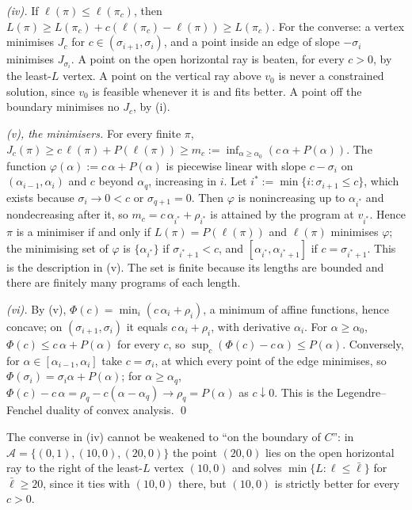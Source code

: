 \emph{(iv).} If $\ell(\pi)\le\ell(\pi_c)$, then $L(\pi)\ge L(\pi_c)+c(\ell(\pi_c)-\ell(\pi))\ge L(\pi_c)$. For the converse: a vertex minimises $J_c$ for $c\in(\sigma_{i+1},\sigma_i)$, and a point inside an edge of slope $-\sigma_i$ minimises $J_{\sigma_i}$. A point on the open horizontal ray is beaten, for every $c>0$, by the least-$L$ vertex. A point on the vertical ray above $v_0$ is never a constrained solution, since $v_0$ is feasible whenever it is and fits better. A point off the boundary minimises no $J_c$, by (i).

\emph{(v), the minimisers.} For every finite $\pi$, $J_c(\pi)\ge c\,\ell(\pi)+P(\ell(\pi))\ge m_c:=\inf_{\alpha\ge\alpha_0}(c\,\alpha+P(\alpha))$. The function $\varphi(\alpha):=c\,\alpha+P(\alpha)$ is piecewise linear with slope $c-\sigma_i$ on $(\alpha_{i-1},\alpha_i)$ and $c$ beyond $\alpha_q$, increasing in $i$. Let $i^*:=\min\{i:\sigma_{i+1}\le c\}$, which exists because $\sigma_i\to0<c$ or $\sigma_{q+1}=0$. Then $\varphi$ is nonincreasing up to $\alpha_{i^*}$ and nondecreasing after it, so $m_c=c\,\alpha_{i^*}+\rho_{i^*}$ is attained by the program at $v_{i^*}$. Hence $\pi$ is a minimiser if and only if $L(\pi)=P(\ell(\pi))$ and $\ell(\pi)$ minimises $\varphi$; the minimising set of $\varphi$ is $\{\alpha_{i^*}\}$ if $\sigma_{i^*+1}<c$, and $[\alpha_{i^*},\alpha_{i^*+1}]$ if $c=\sigma_{i^*+1}$. This is the description in (v). The set is finite because its lengths are bounded and there are finitely many programs of each length.

\emph{(vi).} By (v), $\Phi(c)=\min_i(c\,\alpha_i+\rho_i)$, a minimum of affine functions, hence concave; on $(\sigma_{i+1},\sigma_i)$ it equals $c\,\alpha_i+\rho_i$, with derivative $\alpha_i$. For $\alpha\ge\alpha_0$, $\Phi(c)\le c\,\alpha+P(\alpha)$ for every $c$, so $\sup_c(\Phi(c)-c\,\alpha)\le P(\alpha)$. Conversely, for $\alpha\in[\alpha_{i-1},\alpha_i]$ take $c=\sigma_i$, at which every point of the edge minimises, so $\Phi(\sigma_i)=\sigma_i\alpha+P(\alpha)$; for $\alpha\ge\alpha_q$, $\Phi(c)-c\,\alpha=\rho_q-c(\alpha-\alpha_q)\to\rho_q=P(\alpha)$ as $c\downarrow0$. This is the Legendre--Fenchel duality of convex analysis. \qed

\begin{remark}\label{rem:setup:hullconverse}
The converse in (iv) cannot be weakened to ``on the boundary of $C$'': in $\mathcal A=\{(0,1),(10,0),(20,0)\}$ the point $(20,0)$ lies on the open horizontal ray to the right of the least-$L$ vertex $(10,0)$ and solves $\min\{L:\ell\le\bar\ell\}$ for $\bar\ell\ge20$, since it ties with $(10,0)$ there, but $(10,0)$ is strictly better for every $c>0$.
\end{remark}

